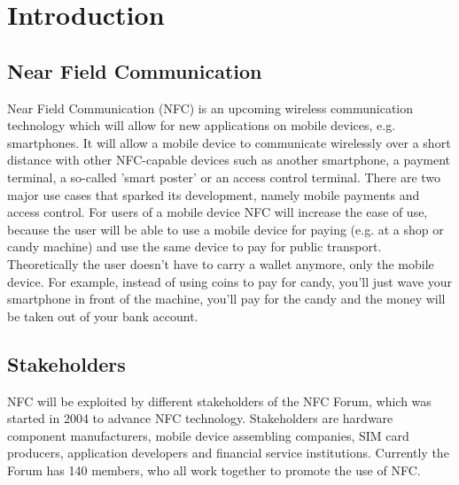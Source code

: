 \chapter{Introduction}


\section{Near Field Communication} %
Near Field Communication (NFC) is an upcoming wireless communication technology which will allow for new applications on mobile devices, e.g. smartphones.
It will allow a mobile device to communicate wirelessly over a short distance with other NFC-capable devices such as another smartphone, a payment terminal, a so-called 'smart poster' or an access control terminal.
There are two major use cases that sparked its development, namely mobile payments and access control.
For users of a mobile device NFC will increase the ease of use, because the user will be able to use a mobile device for paying (e.g. at a shop or candy machine) and use the same device to pay for public transport.
Theoretically the user doesn't have to carry a wallet anymore, only the mobile device.
For example, instead of using coins to pay for candy, you'll just wave your smartphone in front of the machine, you'll pay for the candy and the money will be taken out of your bank account. 


\section{Stakeholders}
NFC will be exploited by different stakeholders of the NFC Forum, which was started in 2004 to advance NFC technology.
Stakeholders are hardware component manufacturers, mobile device assembling companies, SIM card producers, application developers and financial service institutions.
Currently the Forum has 140 members, who all work together to promote the use of NFC. 

